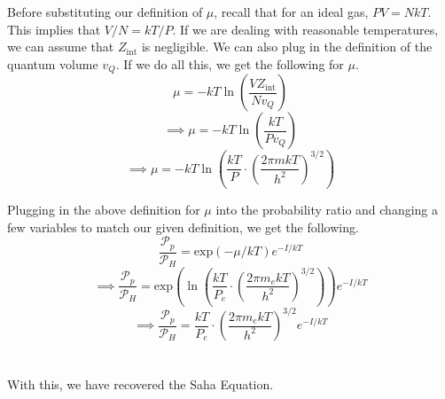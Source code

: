 \documentclass[12pt]{article}
\begin{document}
\begin{flushleft}
Before substituting our definition of $\mu$, recall that for an ideal gas, $PV=NkT$.
This implies that $V/N=kT/P$.
If we are dealing with reasonable temperatures, we can assume that $Z_\text{int}$ is negligible.
We can also plug in the definition of the quantum volume $v_Q$.
If we do all this, we get the following for $\mu$.
$$\mu=-kT\ln\left(\frac{VZ_\text{int}}{Nv_Q}\right)$$
$$\implies\mu=-kT\ln\left(\frac{kT}{Pv_Q}\right)$$
$$\implies\mu=-kT\ln\left(\frac{kT}{P}\cdot\left(\frac{2\pi mkT}{h^2}\right)^{3/2}\right)$$

Plugging in the above definition for $\mu$ into the probability ratio and changing a few variables to match our given definition, we get the following.
$$\frac{\mathcal{P}_p}{\mathcal{P}_H}=\text{exp}\left(-\mu/kT\right)e^{-I/kT}$$
$$\implies\frac{\mathcal{P}_p}{\mathcal{P}_H}=\text{exp}\left(\ln\left(\frac{kT}{P_e}\cdot\left(\frac{2\pi m_ekT}{h^2}\right)^{3/2}\right)\right)e^{-I/kT}$$
$$\implies\frac{\mathcal{P}_p}{\mathcal{P}_H}=\frac{kT}{P_e}\cdot\left(\frac{2\pi m_ekT}{h^2}\right)^{3/2}e^{-I/kT}$$\\~\\

With this, we have recovered the Saha Equation.




\end{flushleft}
\end{document}
